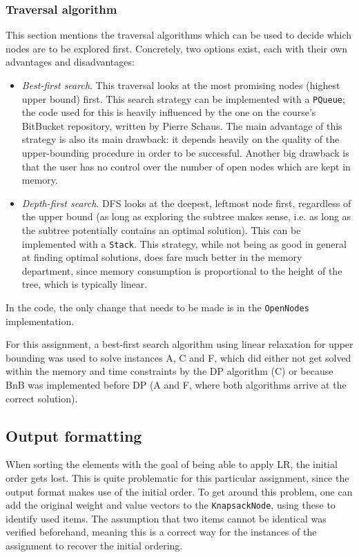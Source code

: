 \documentclass[journal]{IEEEtran}
\newcommand{\scala}[1]{\texttt{#1}}
\begin{document}
\subsubsection{Traversal algorithm}
This section mentions the traversal algorithms which can be used to decide which nodes are to be explored first.
Concretely, two options exist, each with their own advantages and disadvantages:
\begin{itemize}
	\item \emph{Best-first search}.
	This traversal looks at the most promising nodes (highest upper bound) first.
	This search strategy can be implemented with a \scala{PQueue}; the code used for this is heavily influenced by the one on the course's BitBucket repository, written by Pierre Schaus.
	The main advantage of this strategy is also its main drawback: it depends heavily on the quality of the upper-bounding procedure in order to be successful.
	Another big drawback is that the user has no control over the number of open nodes which are kept in memory.
	\item \emph{Depth-first search}.
	DFS looks at the deepest, leftmost node first, regardless of the upper bound (as long as exploring the subtree makes sense, i.e. as long as the subtree potentially contains an optimal solution).
	This can be implemented with a \scala{Stack}.
	This strategy, while not being as good in general at finding optimal solutions, does fare much better in the memory department, since memory consumption is proportional to the height of the tree, which is typically linear.
\end{itemize}
In the code, the only change that needs to be made is in the \scala{OpenNodes} implementation.

For this assignment, a best-first search algorithm using linear relaxation for upper bounding was used to solve instances A, C and F, which did either not get solved within the memory and time constraints by the DP algorithm (C) or because BnB was implemented before DP (A and F, where both algorithms arrive at the correct solution).

\subsection{Output formatting}
\label{sec:bnboutput}
When sorting the elements with the goal of being able to apply LR, the initial order gets lost.
This is quite problematic for this particular assignment, since the output format makes use of the initial order.
To get around this problem, one can add the original weight and value vectors to the \scala{KnapsackNode}, using these to identify used items.
The assumption that two items cannot be identical was verified beforehand, meaning this is a correct way for the instances of the assignment to recover the initial ordering.
\end{document}
